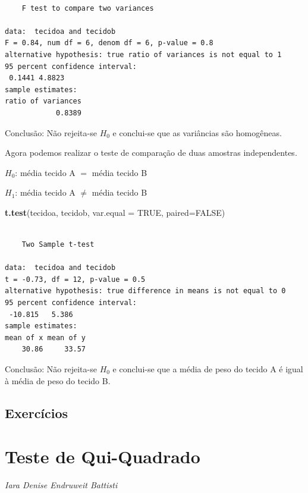 \documentclass[12pt,brazil,oneside]{book}
\newenvironment{Shaded}{\begin{snugshade}}{\end{snugshade}}
\newcommand{\DataTypeTok}[1]{\textcolor[rgb]{0.13,0.29,0.53}{#1}}
\newcommand{\KeywordTok}[1]{\textcolor[rgb]{0.13,0.29,0.53}{\textbf{#1}}}
\newcommand{\NormalTok}[1]{#1}
\newcommand{\OtherTok}[1]{\textcolor[rgb]{0.56,0.35,0.01}{#1}}
\begin{document}
\begin{verbatim}

    F test to compare two variances

data:  tecidoa and tecidob
F = 0.84, num df = 6, denom df = 6, p-value = 0.8
alternative hypothesis: true ratio of variances is not equal to 1
95 percent confidence interval:
 0.1441 4.8823
sample estimates:
ratio of variances 
            0.8389 
\end{verbatim}

Conclusão: Não rejeita-se \(H_0\) e conclui-se que as variâncias são homogêneas.

Agora podemos realizar o teste de comparação de duas amostras independentes.

\textbf{\(H_0\)}: média tecido A \(=\) média tecido B

\textbf{\(H_1\)}: média tecido A \(\neq\) média tecido B

\begin{Shaded}
\begin{Highlighting}[]
\KeywordTok{t.test}\NormalTok{(tecidoa, tecidob, }\DataTypeTok{var.equal =} \OtherTok{TRUE}\NormalTok{, }\DataTypeTok{paired=}\OtherTok{FALSE}\NormalTok{)}
\end{Highlighting}
\end{Shaded}

\begin{verbatim}

    Two Sample t-test

data:  tecidoa and tecidob
t = -0.73, df = 12, p-value = 0.5
alternative hypothesis: true difference in means is not equal to 0
95 percent confidence interval:
 -10.815   5.386
sample estimates:
mean of x mean of y 
    30.86     33.57 
\end{verbatim}

Conclusão: Não rejeita-se \(H_0\) e conclui-se que a média de peso do tecido A é igual à média de peso do tecido B.

\hypertarget{exercicios-2}{%
\section{Exercícios}\label{exercicios-2}}

\hypertarget{qui}{%
\chapter{Teste de Qui-Quadrado}\label{qui}}

\emph{Iara Denise Endruweit Battisti}
\end{document}
